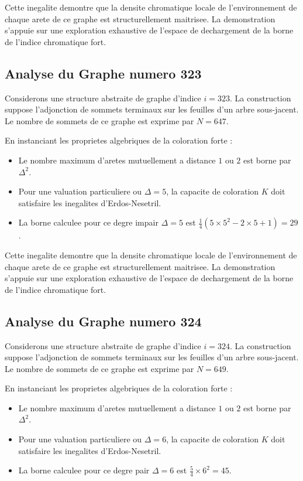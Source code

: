 \documentclass[11pt,a4paper]{article}
\begin{document}
Cette inegalite demontre que la densite chromatique locale de l'environnement de chaque arete de ce graphe est structurellement maitrisee. La demonstration s'appuie sur une exploration exhaustive de l'espace de dechargement de la borne de l'indice chromatique fort.

\subsection{Analyse du Graphe numero 323}
Considerons une structure abstraite de graphe d'indice $i = 323$. La construction suppose l'adjonction de sommets terminaux sur les feuilles d'un arbre sous-jacent. Le nombre de sommets de ce graphe est exprime par $N = 647$.

En instanciant les proprietes algebriques de la coloration forte :
\begin{itemize}
\item Le nombre maximum d'aretes mutuellement a distance $1$ ou $2$ est borne par $\Delta^2$.
\item Pour une valuation particuliere ou $\Delta = 5$, la capacite de coloration $K$ doit satisfaire les inegalites d'Erdos-Nesetril.
\item La borne calculee pour ce degre impair $\Delta = 5$ est $\frac{1}{4}(5 \times 5^2 - 2 \times 5 + 1) = 29$.
\end{itemize}

Cette inegalite demontre que la densite chromatique locale de l'environnement de chaque arete de ce graphe est structurellement maitrisee. La demonstration s'appuie sur une exploration exhaustive de l'espace de dechargement de la borne de l'indice chromatique fort.

\subsection{Analyse du Graphe numero 324}
Considerons une structure abstraite de graphe d'indice $i = 324$. La construction suppose l'adjonction de sommets terminaux sur les feuilles d'un arbre sous-jacent. Le nombre de sommets de ce graphe est exprime par $N = 649$.

En instanciant les proprietes algebriques de la coloration forte :
\begin{itemize}
\item Le nombre maximum d'aretes mutuellement a distance $1$ ou $2$ est borne par $\Delta^2$.
\item Pour une valuation particuliere ou $\Delta = 6$, la capacite de coloration $K$ doit satisfaire les inegalites d'Erdos-Nesetril.
\item La borne calculee pour ce degre pair $\Delta = 6$ est $\frac{5}{4} \times 6^2 = 45$.
\end{itemize}
\end{document}

